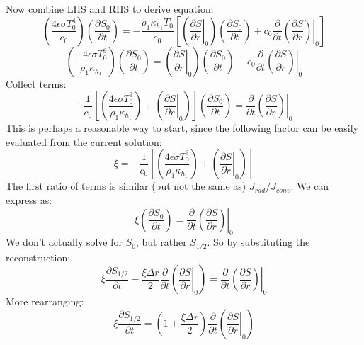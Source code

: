 Now combine LHS and RHS to derive equation:
\begin{equation}
\left( \frac{4 \epsilon \sigma T_0^4}{c_0} \right) \left(\frac{\partial S_0}{\partial t} \right) = - \frac{\rho_1 \kappa_{h_1} T_0}{c_0} \left[ \left(\left.\frac{\partial S}{\partial r}\right|_0 \right) \left( \frac{\partial S_0}{\partial t} \right) + c_0 \frac{\partial}{\partial t} \left. \left(\frac{\partial S}{\partial r}\right) \right|_0  \right]
\end{equation}
\begin{equation}
\left( \frac{-4 \epsilon \sigma T_0^3}{\rho_1 \kappa_{h_1}} \right) \left(\frac{\partial S_0}{\partial t} \right) = \left(\left.\frac{\partial S}{\partial r}\right|_0 \right) \left( \frac{\partial S_0}{\partial t} \right) + c_0 \frac{\partial}{\partial t} \left. \left(\frac{\partial S}{\partial r}\right) \right|_0
\end{equation}
Collect terms:
\begin{equation}
-\frac{1}{c_0} \left[ \left( \frac{4 \epsilon \sigma T_0^3}{\rho_1 \kappa_{h_1}} \right) + \left(\left.\frac{\partial S}{\partial r}\right|_0 \right) \right] \left(\frac{\partial S_0}{\partial t} \right) = \frac{\partial}{\partial t} \left. \left(\frac{\partial S}{\partial r}\right) \right|_0
\end{equation}
This is perhaps a reasonable way to start, since the following factor can be easily evaluated from the current solution:
\begin{equation}
\xi = -\frac{1}{c_0} \left[ \left( \frac{4 \epsilon \sigma T_0^3}{\rho_1 \kappa_{h_1}} \right) + \left(\left.\frac{\partial S}{\partial r}\right|_0 \right) \right] 
\end{equation}
The first ratio of terms is similar (but not the same as) $J_{rad}/J_{conv}$.  We can express as:
\begin{equation}
\xi \left(\frac{\partial S_0}{\partial t} \right) = \frac{\partial}{\partial t} \left. \left(\frac{\partial S}{\partial r}\right) \right|_0
\end{equation}
We don't actually solve for $S_0$, but rather $S_{1/2}$.  So by substituting the reconstruction:
\begin{equation}
\xi \frac{\partial S_{1/2}}{\partial t} - \frac{\xi \Delta r}{2} \frac{\partial}{\partial t} \left( \left. \frac{\partial S}{\partial r}\right|_0 \right) = \frac{\partial}{\partial t} \left. \left(\frac{\partial S}{\partial r}\right) \right|_0
\end{equation}
More rearranging:
\begin{equation}
\xi \frac{\partial S_{1/2}}{\partial t} = \left(1 + \frac{\xi \Delta r}{2} \right) \frac{\partial}{\partial t} \left( \left. \frac{\partial S}{\partial r}\right|_0 \right)
\end{equation}
